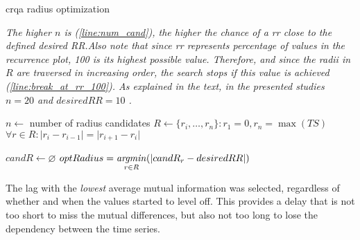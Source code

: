 \begin{algorithm}[t]
	\caption{\acs{crqa} radius optimization}
	\label{alg:radius_opt}
	\algorithmcaption
		{\emph{The higher $n$ is (\cref{line:num_cand}), the higher the chance of a \ac{rr} close to the defined \emph{desired RR}.Also note that since \ac{rr} represents percentage of values in the recurrence plot, 100 is its highest possible value.
		Therefore, and since the radii in $R$ are traversed in increasing order, the search stops if this value is achieved (\cref{line:break_at_rr_100}).
		As explained in the text, in the presented studies $n = 20$ and $desiredRR = 10$ \citep[see][]{Coco2014crqa-r}.}}
	\DontPrintSemicolon
	
	
	$n \gets$ number of radius candidates \label{line:num_cand}\;
	$R \gets \{r_i, \ldots, r_n\} : r_1 = 0, r_n = \max(TS)$\;
	$\forall r \in R : \lvert r_i - r_{i-1} \rvert = \lvert r_{i+1} - r_i \rvert$ 
	
	$candR \gets \varnothing$\;
	$optRadius = \displaystyle\operatorname*{\mathit{argmin}}_{r \in R}(\lvert candR_r - desiredRR \rvert)$\;
\end{algorithm}
%
The lag with the \emph{lowest} average mutual information was selected, regardless of whether and when the values started to level off.
This provides a delay that is not too short to miss the mutual differences, but also not too long to lose the dependency between the time series.
